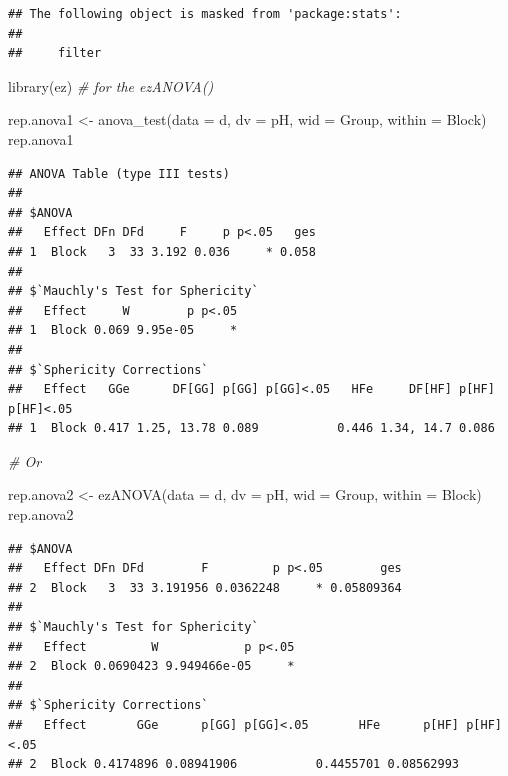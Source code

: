 \documentclass[
]{book}
\newenvironment{Shaded}{\begin{snugshade}}{\end{snugshade}}
\newcommand{\AttributeTok}[1]{\textcolor[rgb]{0.77,0.63,0.00}{#1}}
\newcommand{\CommentTok}[1]{\textcolor[rgb]{0.56,0.35,0.01}{\textit{#1}}}
\newcommand{\FunctionTok}[1]{\textcolor[rgb]{0.00,0.00,0.00}{#1}}
\newcommand{\NormalTok}[1]{#1}
\newcommand{\OtherTok}[1]{\textcolor[rgb]{0.56,0.35,0.01}{#1}}
\begin{document}
\begin{verbatim}
## The following object is masked from 'package:stats':
## 
##     filter
\end{verbatim}

\begin{Shaded}
\begin{Highlighting}[]
\FunctionTok{library}\NormalTok{(ez)  }\CommentTok{\# for the ezANOVA()}

\NormalTok{rep.anova1 }\OtherTok{\textless{}{-}} \FunctionTok{anova\_test}\NormalTok{(}\AttributeTok{data =}\NormalTok{ d, }\AttributeTok{dv =}\NormalTok{ pH, }\AttributeTok{wid =}\NormalTok{ Group, }\AttributeTok{within =}\NormalTok{ Block)}
\NormalTok{rep.anova1}
\end{Highlighting}
\end{Shaded}

\begin{verbatim}
## ANOVA Table (type III tests)
## 
## $ANOVA
##   Effect DFn DFd     F     p p<.05   ges
## 1  Block   3  33 3.192 0.036     * 0.058
## 
## $`Mauchly's Test for Sphericity`
##   Effect     W        p p<.05
## 1  Block 0.069 9.95e-05     *
## 
## $`Sphericity Corrections`
##   Effect   GGe      DF[GG] p[GG] p[GG]<.05   HFe     DF[HF] p[HF] p[HF]<.05
## 1  Block 0.417 1.25, 13.78 0.089           0.446 1.34, 14.7 0.086
\end{verbatim}

\begin{Shaded}
\begin{Highlighting}[]
\CommentTok{\# Or}

\NormalTok{rep.anova2 }\OtherTok{\textless{}{-}} \FunctionTok{ezANOVA}\NormalTok{(}\AttributeTok{data =}\NormalTok{ d, }\AttributeTok{dv =}\NormalTok{ pH, }\AttributeTok{wid =}\NormalTok{ Group, }\AttributeTok{within =}\NormalTok{ Block)}
\NormalTok{rep.anova2}
\end{Highlighting}
\end{Shaded}

\begin{verbatim}
## $ANOVA
##   Effect DFn DFd        F         p p<.05        ges
## 2  Block   3  33 3.191956 0.0362248     * 0.05809364
## 
## $`Mauchly's Test for Sphericity`
##   Effect         W            p p<.05
## 2  Block 0.0690423 9.949466e-05     *
## 
## $`Sphericity Corrections`
##   Effect       GGe      p[GG] p[GG]<.05       HFe      p[HF] p[HF]<.05
## 2  Block 0.4174896 0.08941906           0.4455701 0.08562993
\end{verbatim}
\end{document}
